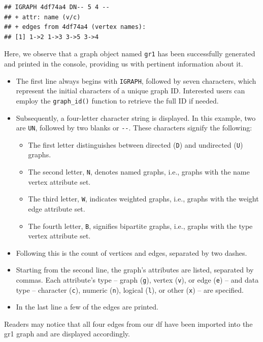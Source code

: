 \documentclass[
]{book}
\providecommand{\tightlist}{%
  \setlength{\itemsep}{0pt}\setlength{\parskip}{0pt}}
\begin{document}
\begin{verbatim}
## IGRAPH 4df74a4 DN-- 5 4 -- 
## + attr: name (v/c)
## + edges from 4df74a4 (vertex names):
## [1] 1->2 1->3 3->5 3->4
\end{verbatim}

Here, we observe that a graph object named \texttt{gr1} has been successfully generated and printed in the console, providing us with pertinent information about it.

\begin{itemize}
\tightlist
\item
  The first line always begins with \texttt{IGRAPH}, followed by seven characters, which represent the initial characters of a unique graph ID. Interested users can employ the \texttt{graph\_id()} function to retrieve the full ID if needed.
\item
  Subsequently, a four-letter character string is displayed. In this example, two are \texttt{UN}, followed by two blanks or \texttt{-\/-}. These characters signify the following:

  \begin{itemize}
  \tightlist
  \item
    The first letter distinguishes between directed (\texttt{D}) and undirected (\texttt{U}) graphs.
  \item
    The second letter, \texttt{N}, denotes named graphs, i.e., graphs with the name vertex attribute set.
  \item
    The third letter, \texttt{W}, indicates weighted graphs, i.e., graphs with the weight edge attribute set.
  \item
    The fourth letter, \texttt{B}, signifies bipartite graphs, i.e., graphs with the type vertex attribute set.
  \end{itemize}
\item
  Following this is the count of vertices and edges, separated by two dashes.
\item
  Starting from the second line, the graph's attributes are listed, separated by commas. Each attribute's type -- graph (\texttt{g}), vertex (\texttt{v}), or edge (\texttt{e}) -- and data type -- character (\texttt{c}), numeric (\texttt{n}), logical (\texttt{l}), or other (\texttt{x}) -- are specified.
\item
  In the last line a few of the edges are printed.
\end{itemize}

Readers may notice that all four edges from our df have been imported into the gr1 graph and are displayed accordingly.
\end{document}
